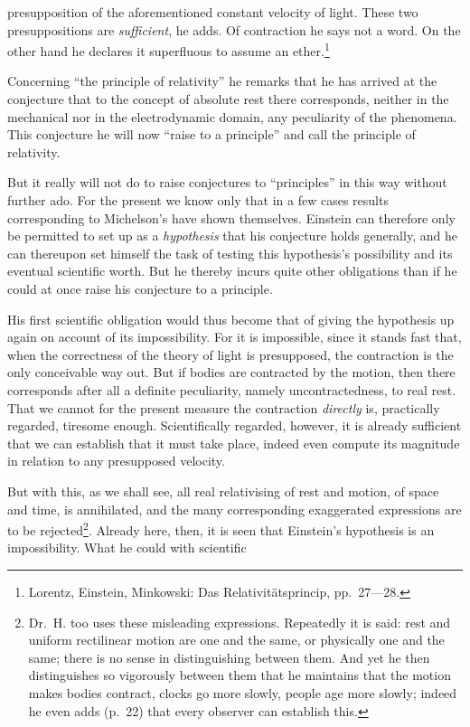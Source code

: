 \documentclass[12pt,a4paper]{article}
\renewcommand{\thefootnote}{*)}
\begin{document}
presupposition of the aforementioned constant velocity of light. These two
presuppositions are \emph{sufficient}, he adds. Of contraction he says not a
word. On the other hand he declares it superfluous to assume an
ether.\footnote{Lorentz, Einstein, Minkowski: Das Relativitätsprincip,
pp.\ 27---28.}

Concerning ``the principle of relativity'' he remarks that he has arrived at
the conjecture that to the concept of absolute rest there corresponds, neither
in the mechanical nor in the electrodynamic domain, any peculiarity of the
phenomena. This conjecture he will now ``raise to a principle'' and call the
principle of relativity.

But it really will not do to raise conjectures to ``principles'' in this way
without further ado. For the present we know only that in a few cases results
corresponding to Michelson's have shown themselves. Einstein can therefore
only be permitted to set up as a \emph{hypothesis} that his conjecture holds
generally, and he can thereupon set himself the task of testing this
hypothesis's possibility and its eventual scientific worth. But he thereby
incurs quite other obligations than if he could at once raise his conjecture
to a principle.

His first scientific obligation would thus become that of giving the
hypothesis up again on account of its impossibility. For it is impossible,
since it stands fast that, when the correctness of the theory of light is
presupposed, the contraction is the only conceivable way out. But if bodies
are contracted by the motion, then there corresponds after all a definite
peculiarity, namely uncontractedness, to real rest. That we cannot for the
present measure the contraction \emph{directly} is, practically regarded,
tiresome enough. Scientifically regarded, however, it is already sufficient
that we can establish that it must take place, indeed even compute its
magnitude in relation to any presupposed velocity.

But with this, as we shall see, all real relativising of rest and motion, of
space and time, is annihilated, and the many corresponding exaggerated
expressions are to be rejected{\renewcommand{\thefootnote}{**)}\footnote{Dr.\ H.
too uses these misleading expressions. Repeatedly it is said: rest and uniform
rectilinear motion are one and the same, or physically one and the same; there
is no sense in distinguishing between them. And yet he then distinguishes so
vigorously between them that he maintains that the motion makes bodies
contract, clocks go more slowly, people age more slowly; indeed he even adds
(p.\ 22) that every observer can establish this.}}. Already here, then, it is
seen that Einstein's hypothesis is an impossibility. What he could with
scientific
\end{document}
